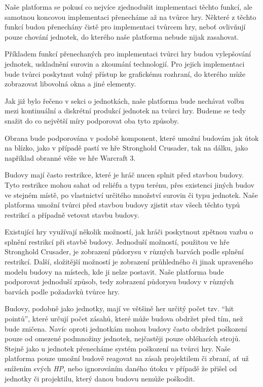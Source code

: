 Naše platforma se pokusí co nejvíce zjednodušit implementaci těchto funkcí, ale samotnou koncovou implementaci přenecháme až na tvůrce hry. Některé z těchto funkcí budou přenechány čistě pro implementaci tvůrcem hry, neboť ovlivňují pouze chování jednotek, do kterého naše platforma nebude nijak zasahovat.

Příkladem funkcí přenechaných pro implementaci tvůrci hry budou vylepšování jednotek, uskladnění surovin a zkoumání technologií. Pro jejich implementaci bude tvůrci poskytnut volný přístup ke grafickému rozhraní, do kterého může zobrazovat libovolná okna a jiné elementy.

Jak již bylo řečeno v  sekci o jednotkách, naše platforma bude nechávat volbu mezi kontinuální a diskrétní produkcí jednotek na tvůrci hry. Budeme se tedy snažit do co největší míry podporovat oba tyto způsoby. 

Obrana bude podporována v podobě komponent, které umožní budovám jak útok na blízko, jako v případě pastí ve hře Stronghold Crusader, tak na dálku, jako například obranné věže ve hře Warcraft 3. 


\done
{}

Budovy mají často restrikce, které je hráč nucen splnit před stavbou budovy. Tyto restrikce mohou sahat od reliéfu a typu terénu, přes existenci jiných budov ve stejném místě, po vlastnictví určitého množství surovin či typu jednotek. Naše platforma umožní tvůrci před stavbou budovy zjistit stav všech těchto typů restrikcí a případně vetovat stavbu budovy. 

Existující hry využívají několik možností, jak hráči poskytnout zpětnou vazbu o splnění restrikcí při stavbě budovy. Jednoduší možností, použitou ve hře Stronghold Crusader, je zobrazení půdorysu v různých barvách podle splnění restrikcí. Další, složitější možností je zobrazení průhledného či jinak upraveného modelu budovy na místech, kde ji nelze postavit.  Naše platforma bude podporovat jednoduší způsob, tedy zobrazení půdorysu budovy v různých barvách podle požadavků tvůrce hry.

\done
{}
\done
{}

Budovy, podobně jako jednotky, mají ve většině her určitý počet tzv. ``hit pointů'', které určují počet zásahů, které může budova obdržet před tím, než bude zničena. Navíc oproti jednotkám mohou budovy často obdržet poškození pouze od omezené podmnožiny jednotek, nejčastěji pouze obléhacích strojů. Stejně jako u jednotek přenecháme systém poškození na tvůrci hry. Naše platforma pouze umožní budově reagovat na zásah projektilem či zbraní, ať už snížením svých \textit{HP}, nebo ignorováním daného útoku v případě že přišel od jednotky či projektilu, který danou budovu nemůže poškodit.

